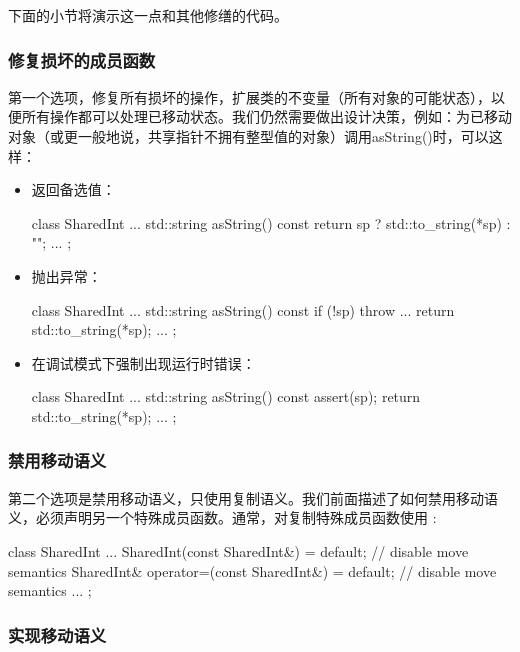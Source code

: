 下面的小节将演示这一点和其他修缮的代码。

\subsubsection{修复损坏的成员函数}

第一个选项，修复所有损坏的操作，扩展类的不变量（所有对象的可能状态），以便所有操作都可以处理已移动状态。我们仍然需要做出设计决策，例如：为已移动对象（或更一般地说，共享指针不拥有整型值的对象）调用asString()时，可以这样：

\begin{itemize}
	\item 返回备选值：

	\begin{cppcode}
class SharedInt {
	...
	std::string asString() const {
		return sp ? std::to_string(*sp) : "";
	}
	...
};
	\end{cppcode}
	\item 抛出异常：

	\begin{cppcode}
class SharedInt {
	...
	std::string asString() const {
		if (!sp) throw ...
		return std::to_string(*sp);
	}
	...
};
	\end{cppcode}
	\item 在调试模式下强制出现运行时错误：

	\begin{cppcode}
class SharedInt {
	...
	std::string asString() const {
		assert(sp);
		return std::to_string(*sp);
	}
	...
};
	\end{cppcode}
\end{itemize}

\subsubsection{禁用移动语义}

第二个选项是禁用移动语义，只使用复制语义。我们前面描述了如何禁用移动语义，必须声明另一个特殊成员函数。通常，对复制特殊成员函数使用 :

\begin{cppcode}
class SharedInt {
	...
	SharedInt(const SharedInt&) = default; // disable move semantics
	SharedInt& operator=(const SharedInt&) = default; // disable move semantics
	...
};
\end{cppcode}

\subsubsection{实现移动语义}

